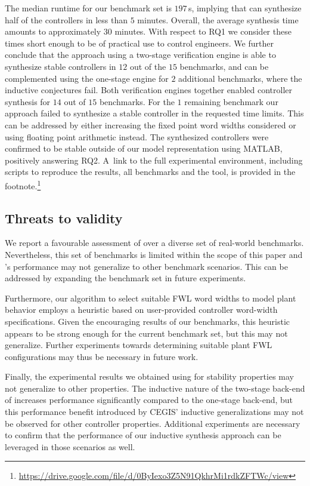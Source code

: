 \documentclass{sig-alternate-05-2015}
\begin{document}
The median runtime for our benchmark set is $197$\,s, implying that \tool
can synthesize half of the controllers in less than $5$ minutes.  Overall,
the average synthesis time amounts to approximately $30$ minutes.  With
respect to RQ1 we consider these times short enough to be of practical use
to control engineers.  We further conclude that the approach
using a two-stage verification engine is able to synthesize stable
controllers in $12$ out of the $15$ benchmarks, and can be complemented
using the one-stage engine for $2$ additional benchmarks, where the
inductive conjectures fail.  Both verification engines together enabled
controller synthesis for $14$ out of $15$ benchmarks.  For the $1$ remaining
benchmark our approach failed to synthesize a stable controller in the
requested time limits.  This can be addressed by either increasing the fixed
point word widths considered or using floating point arithmetic instead. 
The synthesized controllers were confirmed to be stable outside of our
model representation using MATLAB, positively answering RQ2.
A~link to the full experimental environment, including scripts to reproduce
the results, all benchmarks and the \tool tool, is provided in the
footnote.\footnote{\url{https://drive.google.com/file/d/0ByIexo3Z5N91QkhrMi1rdkZFTWc/view}}

\subsection{Threats to validity}

We report a favourable assessment of \tool over a diverse set of real-world
benchmarks. Nevertheless, this set of benchmarks is limited within the
scope of this paper and \tool's performance may not generalize to other
benchmark scenarios. This can be addressed by expanding the benchmark set
in future experiments.

Furthermore, our algorithm to select suitable FWL word widths to model
plant behavior employs a heuristic based on user-provided controller
word-width specifications.  Given the encouraging results of our benchmarks,
this heuristic appears to be strong enough for the current benchmark set,
but this may not generalize.  Further experiments towards determining
suitable plant FWL configurations may thus be necessary in future work.

Finally, the experimental results we obtained using \tool for stability
properties may not generalize to other properties.  The inductive nature of
the two-stage back-end of \tool increases performance significantly compared
to the one-stage back-end, but this performance benefit introduced by CEGIS'
inductive generalizations may not be observed for other controller
properties.  Additional experiments are necessary to confirm that the
performance of our inductive synthesis approach can be leveraged in those
scenarios as well.
\end{document}
